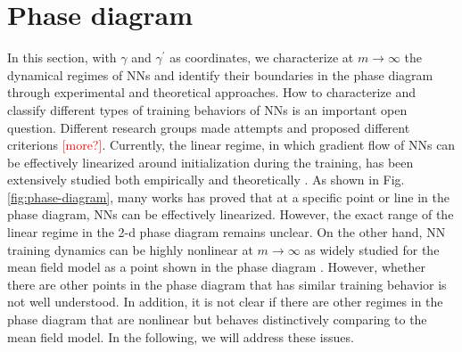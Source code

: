\documentclass{article}
\begin{document}
\section{Phase diagram}
In this section, with $\gamma$ and $\gamma^{\prime}$ as coordinates, we characterize at $m\to\infty$ the dynamical regimes of NNs and identify their boundaries in the phase diagram through experimental and theoretical approaches. 
How to characterize and classify different types of training behaviors of NNs is an important open question. Different research groups made attempts and proposed different criterions \textcolor{red}{[more?]}. Currently, the linear regime, in which gradient flow of NNs can be effectively linearized around initialization during the training, has been extensively studied both empirically and theoretically \cite{jacot_neural_2018,lee_wide_2019,arora2019exact,e2020comparative}. As shown in Fig. \ref{fig:phase-diagram}, many works has proved that at a specific point or line in the phase diagram, NNs can be effectively linearized. However, the exact range of the linear regime in the 2-d phase diagram remains unclear. On the other hand, NN training dynamics can be highly nonlinear at $m\to\infty$ as widely studied for the mean field model as a point shown in the phase diagram \cite{mei_mean_2018,sirignano_mean_2020,rotskoff_parameters_2018}. However, whether there are other points in the phase diagram that has similar training behavior is not well understood. In addition, it is not clear if there are other regimes in the phase diagram that are nonlinear but behaves distinctively comparing to the mean field model. In the following, we will address these issues.
\end{document}

